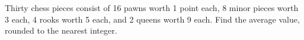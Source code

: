 Thirty chess pieces consist of 16 pawns worth 1 point each, 8 minor pieces worth 3 each, 4 rooks worth 5 each, and 2 queens worth 9 each. Find the average value, rounded to the nearest integer.
